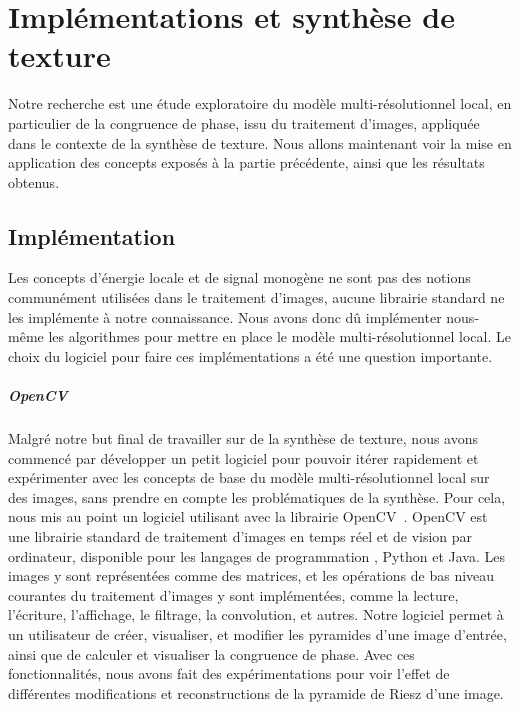 \chapter{Implémentations et synthèse de texture}
\label{chap:chapitre2}

Notre recherche est une étude exploratoire du modèle multi-résolutionnel local, en particulier de la congruence de phase, issu du traitement d'images, appliquée dans le contexte de la synthèse de texture. Nous allons maintenant voir la mise en application des concepts exposés à la partie précédente, ainsi que les résultats obtenus.

\section{Implémentation}

Les concepts d'énergie locale et de signal monogène ne sont pas des notions communément utilisées dans le traitement d'images, aucune librairie standard ne les implémente à notre connaissance. Nous avons donc dû implémenter nous-même les algorithmes pour mettre en place le modèle multi-résolutionnel local. Le choix du logiciel pour faire ces implémentations a été une question importante.


\paragraph{OpenCV}

Malgré notre but final de travailler sur de la synthèse de texture, nous avons commencé par développer un petit logiciel pour pouvoir itérer rapidement et expérimenter avec les concepts de base du modèle multi-résolutionnel local sur des images, sans prendre en compte les problématiques de la synthèse. Pour cela, nous mis au point un logiciel utilisant \cpp avec la librairie OpenCV~\cite{opencv_library}. OpenCV est une librairie standard de traitement d'images en temps réel et de vision par ordinateur, disponible pour les langages de programmation \cpp, Python et Java. Les images y sont représentées comme des matrices, et les opérations de bas niveau courantes du traitement d'images y sont implémentées, comme la lecture, l'écriture, l'affichage, le filtrage, la convolution, et autres.  Notre logiciel permet à un utilisateur de créer, visualiser, et modifier les pyramides d'une image d'entrée, ainsi que de calculer et visualiser la congruence de phase. Avec ces fonctionnalités, nous avons fait des expérimentations pour voir l'effet de différentes modifications et reconstructions de la pyramide de Riesz d'une image.


